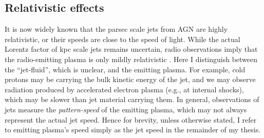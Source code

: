 \subsection{Relativistic effects\label{subsec:relativistic_effects}}
It is now widely known that the parsec scale jets from AGN are highly relativistic, or their speeds are close to the speed of light. While the actual Lorentz factor of kpc scale jets remains uncertain, radio observations imply that the radio-emitting plasma is only mildly relativistic \citep[e.g.,][]{wardle1997fast,mullin2009bayesian}. Here I distinguish between the ``jet-fluid'', which is unclear, and the emitting plasma. For example, cold protons may be carrying the bulk kinetic energy of the jet, and we may observe radiation produced by accelerated electron plasma (e.g., at internal shocks), which may be slower than jet material carrying them. In general, observations of jets measure the \textit{pattern-speed} of the emitting plasma, which may not always represent the actual jet speed. Hence for brevity, unless otherwise stated, I refer to emitting plasma's speed simply as the jet speed in the remainder of my thesis.

